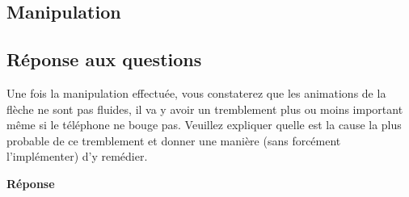 \documentclass[francais,12pt]{article}
\begin{document}
	\subsection*{Manipulation}
	\subsection*{Réponse aux questions}
	Une fois la manipulation effectuée, vous constaterez que les animations de la flèche ne sont pas fluides, il va y avoir un tremblement plus ou moins important même si le téléphone ne bouge pas. Veuillez expliquer quelle est la cause la plus probable de ce tremblement et donner une manière (sans forcément l’implémenter) d’y remédier. 
	
	{\color[rgb]{0,0.5,0.23}\textbf{Réponse}}
	
	
	
\end{document}
